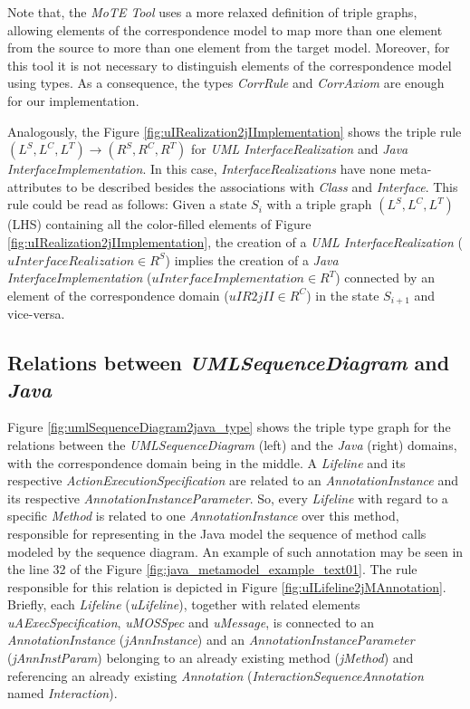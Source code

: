 \documentclass[tuberlin,cic,tc,english,noabntcite, oneside]{iiufrgs}
\begin{document}
Note that, the \emph{MoTE Tool} uses a more relaxed definition of triple graphs, allowing elements of the correspondence model to map more than one element from the source to more than one element from the target model. Moreover, for this tool it is not necessary to distinguish elements of the correspondence model using types. As a consequence, the types \emph{CorrRule} and \emph{CorrAxiom} are enough for our implementation.

Analogously, the Figure \ref{fig:uIRealization2jIImplementation} shows the triple rule $(L^S,L^C,L^T) \rightarrow (R^S,R^C,R^T)$ for \emph{UML InterfaceRealization} and \emph{Java InterfaceImplementation}. In this case, \emph{InterfaceRealizations} have none meta-attributes to be described besides the associations with \emph{Class} and \emph{Interface}. This rule could be read as follows: Given a state $S_i$ with a triple graph $(L^S,L^C,L^T)$ (LHS) containing all the color-filled elements of Figure \ref{fig:uIRealization2jIImplementation}, the creation of a \emph{UML InterfaceRealization} ($uInterfaceRealization \in R^S$) implies the creation of a \emph{Java InterfaceImplementation} ($uInterfaceImplementation \in R^T$) connected by an element of the correspondence domain ($uIR2jII \in R^C$) in the state $S_{i+1}$ and vice-versa.

\subsection{Relations between \emph{UMLSequenceDiagram} and \emph{Java}}
\label{subsec:UmlSequenceDiagram2Java}
Figure \ref{fig:umlSequenceDiagram2java_type} shows the triple type graph for the relations between the \emph{UMLSequenceDiagram} (left) and the \emph{Java} (right) domains, with the correspondence domain being in the middle. A \emph{Lifeline} and its respective \emph{ActionExecutionSpecification} are related to an \emph{AnnotationInstance} and its respective \emph{AnnotationInstanceParameter}. So, every \emph{Lifeline} with regard to a specific \emph{Method} is related to one \emph{AnnotationInstance} over this method, responsible for representing in the Java model the sequence of method calls modeled by the sequence diagram. An example of such annotation may be seen in the line 32 of the Figure \ref{fig:java_metamodel_example_text01}. The rule responsible for this relation is depicted in Figure \ref{fig:uILifeline2jMAnnotation}. Briefly, each \emph{Lifeline} (\emph{uLifeline}), together with related elements \emph{uAExecSpecification}, \emph{uMOSSpec} and \emph{uMessage}, is connected to an \emph{AnnotationInstance} (\emph{jAnnInstance}) and an \emph{AnnotationInstanceParameter} (\emph{jAnnInstParam}) belonging to an already existing method (\emph{jMethod}) and referencing an already existing \emph{Annotation} (\emph{InteractionSequenceAnnotation} named \emph{Interaction}).
\end{document}
